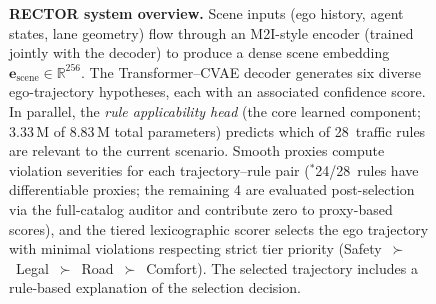 \begin{figure}[t]
\caption{\textbf{RECTOR system overview.}  Scene inputs (ego history, agent states, lane geometry) flow through an M2I-style encoder (trained jointly with the decoder) to produce a dense scene embedding
$\mathbf{e}_{\text{scene}}\in\mathbb{R}^{256}$.  The Transformer–CVAE decoder generates six diverse ego-trajectory hypotheses, each with an associated confidence score.  In parallel, the \emph{rule applicability head} (the core learned component; 3.33\,M of 8.83\,M total parameters) predicts which of 28~traffic rules are relevant to the current scenario.  Smooth proxies compute violation severities for each trajectory–rule pair ($^*$24/28~rules have differentiable proxies; the remaining 4 are evaluated post-selection via the full-catalog auditor and contribute zero to proxy-based scores), and the tiered lexicographic scorer selects the ego trajectory with minimal violations respecting strict tier priority
(Safety~$\succ$~Legal~$\succ$~Road~$\succ$~Comfort).  The selected trajectory includes a rule-based explanation of the selection decision.}
\label{fig:rector_architecture}
\end{figure}
